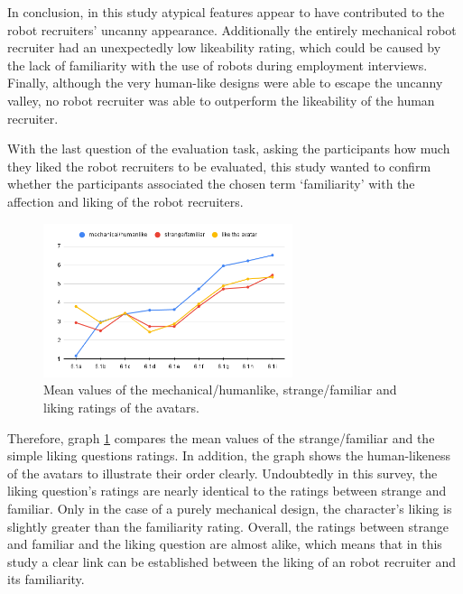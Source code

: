In conclusion, in this study atypical features appear to have contributed to the robot recruiters' uncanny appearance. Additionally the entirely mechanical robot recruiter had an unexpectedly low likeability rating, which could be caused by the lack of familiarity with the use of robots during employment interviews. Finally, although the very human-like designs were able to escape the uncanny valley, no robot recruiter was able to outperform the likeability of the human recruiter.\par
With the last question of the evaluation task, asking the participants how much they liked the robot recruiters to be evaluated, this study wanted to confirm whether the participants associated the chosen term `familiarity' with the affection and liking of the robot recruiters. 
\begin{figure} %
    \centering
    \includegraphics[width=0.65\textwidth]{graphics/result/result4.png}
    \caption{Mean values of the mechanical/humanlike, strange/familiar and liking ratings of the avatars.}
    \label{fig:likeability}
\end{figure}
Therefore, graph \ref{fig:likeability} compares the mean values of the strange/familiar and the simple liking questions ratings. In addition, the graph shows the human-likeness of the avatars to illustrate their order clearly. Undoubtedly in this survey, the liking question's ratings are nearly identical to the ratings between strange and familiar. Only in the case of a purely mechanical design, the character's liking is slightly greater than the familiarity rating. Overall, the ratings between strange and familiar and the liking question are almost alike, which means that in this study a clear link can be established between the liking of an robot recruiter and its familiarity.\\
